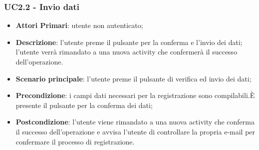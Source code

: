 \subsubsection{UC2.2 - Invio dati}
\begin{itemize}
	\item \textbf{Attori Primari}: utente non autenticato;
	\item \textbf{Descrizione}: l'utente preme il pulsante per la conferma e l'invio dei dati; l'utente verrà rimandato a una nuova activity che confermerà il successo dell'operazione.
	\item \textbf{Scenario principale}: l'utente preme il pulsante di verifica ed invio dei dati;	
	\item \textbf{Precondizione}: i campi dati necessari per la registrazione sono compilabili.È presente il pulsante per la conferma dei dati;
	\item \textbf{Postcondizione}: l'utente viene rimandato a una nuova activity che conferma il successo dell'operazione e avvisa l'utente di controllare la propria e-mail per confermare il processo di registrazione.
\end{itemize}



